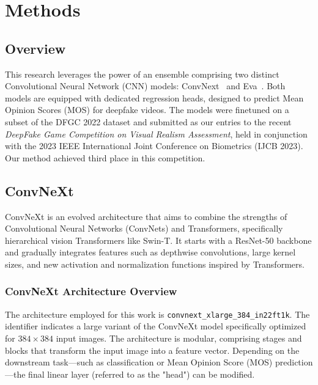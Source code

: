 \documentclass[a4paper,12pt,openright]{book}
\begin{document}
\chapter{Methods}
\label{ch1}

\section{Overview}

This research leverages the power of an ensemble comprising two distinct Convolutional Neural Network (CNN) models:
ConvNext~\cite{DBLP:journals/corr/abs-2201-03545} and Eva~\cite{fang2022eva}. Both models are equipped with dedicated regression heads, designed to predict Mean Opinion Scores (MOS) for deepfake videos. The models were finetuned on a subset of the DFGC 2022 dataset and submitted as our entries to the recent \textit{DeepFake Game Competition on Visual Realism Assessment}, held in conjunction with the 2023 IEEE International Joint Conference on Biometrics (IJCB 2023). Our method achieved third place in this competition.

\section{ConvNeXt}
\label{sec:convnext}

ConvNeXt is an evolved architecture that aims to combine the strengths of Convolutional Neural Networks (ConvNets) and Transformers, specifically hierarchical vision Transformers like Swin-T\cite{DBLP:journals/corr/abs-2103-14030}. It starts with a ResNet-50\cite{DBLP:journals/corr/HeZRS15} backbone and gradually integrates features such as depthwise convolutions, large kernel sizes, and new activation and normalization functions inspired by Transformers.

\subsection{ConvNeXt Architecture Overview}
The architecture employed for this work is \texttt{convnext\_xlarge\_384\_in22ft1k}. The identifier indicates a large variant of the ConvNeXt model specifically optimized for \(384 \times 384\) input images. The architecture is modular, comprising stages and blocks that transform the input image into a feature vector. Depending on the downstream task—such as classification or Mean Opinion Score (MOS) prediction—the final linear layer (referred to as the "head") can be modified.
\end{document}
